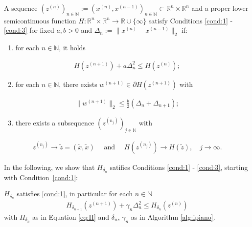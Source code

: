 \documentclass[onecolumn,final,a4paper,13pt,reqno]{siamart}
\begin{document}
\begin{definitionmd}
	A sequence $(z^{(n)})_{n \in \mathbb{N}} := (x^{(n)}, x^{(n - 1)})_{n \in \mathbb{N}} \subset \mathbb{R}^{n} \times \mathbb{R}^n$ and a proper lower semicontinuous function $H : \mathbb{R}^{n} \times \mathbb{R}^n \rightarrow \mathbb{R} \cup \{\infty\}$ satisfy Conditions \ref{cond:1} - \ref{cond:3} for fixed $a,b > 0$ and $\Delta_n := \|x^{(n)} - x^{(n - 1)}\|_2$ if:
	\begin{enumerate}[label=(H\arabic*)]
		\item for each $n \in \mathbb{N}$, it holds\label{cond:1}
	\end{enumerate}
	\begin{align}
		H(z^{(n + 1)}) + a\Delta_n^2 \leq H(z^{(n)});
	\end{align}
	\begin{enumerate}[label=(H\arabic*)]
		\setcounter{enumi}{1}
		\item for each $n \in \mathbb{N}$, there exists $w^{(n + 1)} \in \partial H(z^{(n + 1)})$ with\label{cond:2}
	\end{enumerate}
	\begin{align}
		\|w^{(n + 1)}\|_2 \leq \frac{b}{2}(\Delta_n + \Delta_{n + 1});
	\end{align}
	\begin{enumerate}[label=(H\arabic*)]
		\setcounter{enumi}{2}
		\item there exists a subsequence $(z^{(n_j)})_{j \in \mathbb{N}}$ with\label{cond:3}
	\end{enumerate}
	\begin{align}
		z^{(n_j)} \rightarrow \tilde{z} = (\tilde{x}, \tilde{x})\quad\text{ and }\quad H(z^{(n_j)}) \rightarrow H(\tilde{z}),\quad j \rightarrow \infty.
	\end{align}\label{def:conditions}
\end{definitionmd}

In the following, we show that $H_{\delta_n}$ satifies Conditions \ref{cond:1} - \ref{cond:3}, starting with Condition~\ref{cond:1}:

\begin{lemmamd}
	$H_{\delta_n}$ satisfies \ref{cond:1}, in particular for each $n \in \mathbb{N}$
	\begin{align}
	H_{\delta_{n + 1}}(z^{(n + 1)})  + \gamma_n \Delta_n^2 \leq H_{\delta_n}(z^{(n)})\label{eq:h1}
	\end{align}
	with $H_{\delta_n}$ as in Equation \eqref{eq:H} and $\delta_n$, $\gamma_n$ as in Algorithm \ref{alg:ipiano}.\label{lemma:h1}
\end{lemmamd}
\end{document}
